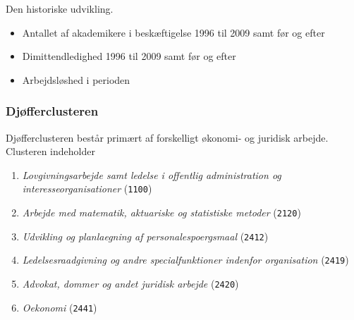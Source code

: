 % 
Den historiske udvikling. 
 \begin{itemize} [topsep=6pt,itemsep=-1ex]
   \item Antallet af akademikere i beskæftigelse 1996 til 2009 samt før og efter
   \item Dimittendledighed 1996 til 2009 samt før og efter
   \item Arbejdsløshed i perioden
 \end{itemize}




\subsubsection{Djøfferclusteren \label{}}
% 
Djøfferclusteren består primært af forskelligt økonomi- og juridisk arbejde. Clusteren indeholder
 \begin{enumerate} [topsep=6pt,itemsep=-1ex]
   \item \emph{Lovgivningsarbejde samt ledelse i offentlig administration og interesseorganisationer} (\texttt{1100}) 
   \item \emph{Arbejde med matematik, aktuariske og statistiske metoder} (\texttt{2120}) 
   \item \emph{Udvikling og planlaegning af personalespoergsmaal} (\texttt{2412}) 
   \item \emph{Ledelsesraadgivning og andre specialfunktioner indenfor organisation} (\texttt{2419}) 
   \item \emph{Advokat, dommer og andet juridisk arbejde} (\texttt{2420}) 
   \item \emph{Oekonomi} (\texttt{2441}) 
 \end{enumerate}




